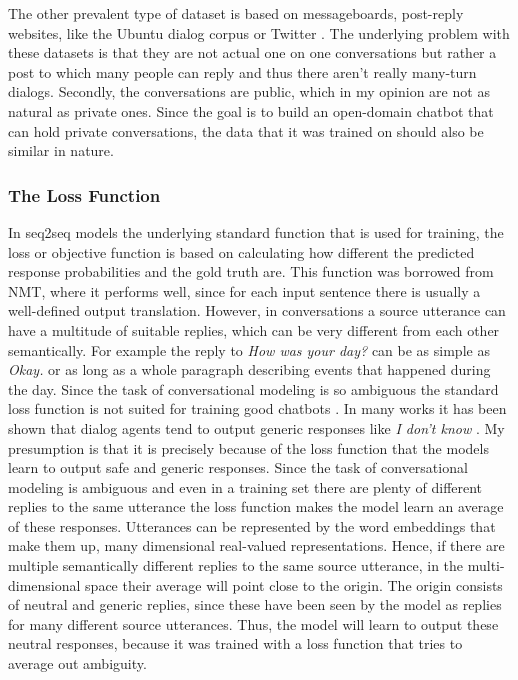 \documentclass[12pt]{article}
\begin{document}
The other prevalent type of dataset is based on messageboards, post-reply websites, like the Ubuntu dialog corpus \cite{Lowe:2015} or Twitter \cite{Shang:2015,Li:2016,Jena:2017}. The underlying problem with these datasets is that they are not actual one on one conversations but rather a post to which many people can reply and thus there aren't really many-turn dialogs. Secondly, the conversations are public, which in my opinion are not as natural as private ones. Since the goal is to build an open-domain chatbot that can hold private conversations, the data that it was trained on should also be similar in nature.

\subsubsection{The Loss Function} \label{sssec:loss_function}
In seq2seq models the underlying standard function that is used for training, the loss or objective function is based on calculating how different the predicted response probabilities and the gold truth are. This function was borrowed from NMT, where it performs well, since for each input sentence there is usually a well-defined output translation. However, in conversations a source utterance can have a multitude of suitable replies, which can be very different from each other semantically. For example the reply to \textit{How was your day?} can be as simple as \textit{Okay.} or as long as a whole paragraph describing events that happened during the day. Since the task of conversational modeling is so ambiguous the standard loss function is not suited for training good chatbots \cite{Vinyals:2015,Li:2015}. In many works it has been shown that dialog agents tend to output generic responses like \textit{I don't know} \cite{Vinyals:2015,Serban:2015,Li:2015,Li:2016,Jena:2017}. My presumption is that it is precisely because of the loss function that the models learn to output safe and generic responses. Since the task of conversational modeling is ambiguous and even in a training set there are plenty of different replies to the same utterance the loss function makes the model learn an average of these responses. Utterances can be represented by the word embeddings that make them up, many dimensional real-valued representations. Hence, if there are multiple semantically different replies to the same source utterance, in the multi-dimensional space their average will point close to the origin. The origin consists of neutral and generic replies, since these have been seen by the model as replies for many different source utterances. Thus, the model will learn to output these neutral responses, because it was trained with a loss function that tries to average out ambiguity.
\end{document}

